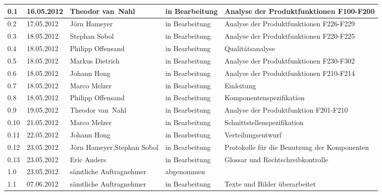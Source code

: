 \begin{longtable}{|m{1.78cm}|m{1.59cm}|m{2.86cm}|m{1.9cm}|m{5.25cm}|}
  0.1   &    16.05.2012    &    Theodor \mbox{van Nahl}    &   in Bearbeitung     &    Analyse der Produktfunktionen F100-F200\\       %
  \hline                                              %
  0.2   &    17.05.2012    &    Jörn Hameyer    &   in Bearbeitung     &    Analyse der Produktfunktionen F226-F229\\       %
  \hline
  0.3   &    18.05.2012    &    Stephan Sobol    &   in Bearbeitung     &    Analyse der Produktfunktionen F220-F225\\       %
  \hline
  0.4   &    18.05.2012    &    Philipp \mbox{Offensand}    &   in Bearbeitung     &    Qualitätsanalyse\\       %
  \hline
  0.5   &    18.05.2012    &    Markus Dietrich    &   in Bearbeitung     &    Analyse der Produktfunktionen F230-F302\\       %
  \hline
  0.6   &    18.05.2012    &    Johann Hong    &   in Bearbeitung     &    Analyse der Produktfunktionen F210-F214\\       %
  \hline
  0.7   &    18.05.2012    &    Marco Melzer    &   in Bearbeitung     &    Einleitung\\       %
  \hline
  0.8   &    18.05.2012    &    Philipp \mbox{Offensand}    &   in Bearbeitung     &    Komponentenspezifikation\\       %
  \hline
  0.9   &    19.05.2012    &    Theodor \mbox{van Nahl}    &   in Bearbeitung     &    Analyse der Produktfunktion F201-F210\\       %
  \hline
  0.10   &   21.05.2012    &    Marco Melzer    &   in Bearbeitung     &    Schnittstellenspezifikation\\       %
  \hline
  0.11   &   22.05.2012    &    Johann Hong    &   in Bearbeitung     &    Verteilungsentwurf\\       %
  \hline
  0.12   &   23.05.2012    &    Jörn Hameyer,\newline Stephan Sobol    &   in Bearbeitung     &    Protokolle für die Benutzung der Komponenten\\    
  \hline
  0.13   &   23.05.2012    &    Eric Anders &   in Bearbeitung  &   Glossar und Rechtschreibkontrolle \\
  \hline
  1.0   &    23.05.2012    &    sämtliche Auftragnehmer    &   abgenommen     &    \\       %
  \hline
  1.1   &    07.06.2012    &    sämtliche Auftragnehmer    &   in Bearbeitung &
  Texte und Bilder überarbeitet  \\       %
  \hline
  

\end{longtable}

